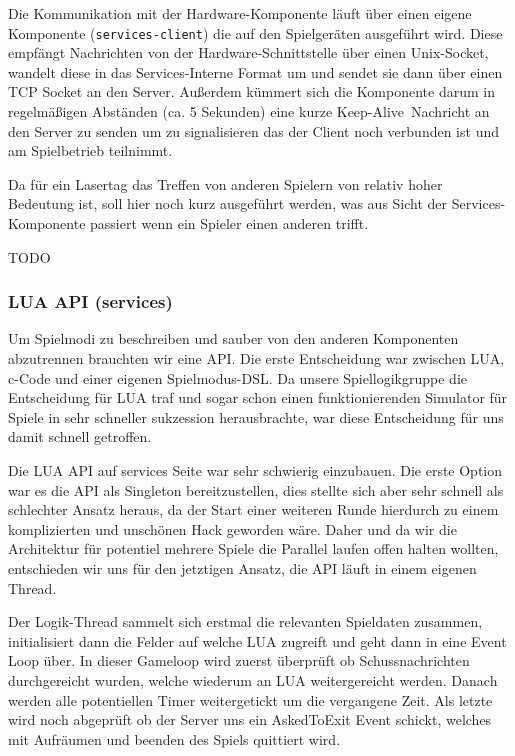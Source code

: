 Die Kommunikation mit der Hardware-Komponente läuft über einen eigene Komponente (\texttt{services-client}) die auf den Spielgeräten ausgeführt wird. Diese empfängt Nachrichten von der Hardware-Schnittstelle über einen Unix-Socket, wandelt diese in das Services-Interne Format um und sendet sie dann über einen TCP Socket an den Server. Außerdem kümmert sich die Komponente darum in regelmäßigen Abständen (ca. 5 Sekunden) eine kurze \glqq Keep-Alive\grqq \, Nachricht an den Server zu senden um zu signalisieren das der Client noch verbunden ist und am Spielbetrieb teilnimmt.

Da für ein Lasertag das Treffen von anderen Spielern von relativ hoher Bedeutung ist, soll hier noch kurz ausgeführt werden, was aus Sicht der Services-Komponente passiert wenn ein Spieler einen anderen trifft.

TODO

\subsubsection{LUA API (services)}

Um Spielmodi zu beschreiben und sauber von den anderen Komponenten abzutrennen brauchten wir eine API. Die erste Entscheidung war zwischen LUA, c-Code und einer eigenen Spielmodus-DSL. Da unsere Spiellogikgruppe die Entscheidung für LUA traf und sogar schon einen funktionierenden Simulator für Spiele in sehr schneller sukzession herausbrachte, war diese Entscheidung für uns damit schnell getroffen.

Die LUA API auf services Seite war sehr schwierig einzubauen. Die erste Option war es die API als Singleton bereitzustellen, dies stellte sich aber sehr schnell als schlechter Ansatz heraus, da der Start einer weiteren Runde hierdurch zu einem komplizierten und unschönen Hack geworden wäre. Daher und da wir die Architektur für potentiel mehrere Spiele die Parallel laufen offen halten wollten, entschieden wir uns für den jetztigen Ansatz, die API läuft in einem eigenen Thread. 

Der Logik-Thread sammelt sich erstmal die relevanten Spieldaten zusammen, initialisiert dann die Felder auf welche LUA zugreift und geht dann in eine Event Loop über. In dieser Gameloop wird zuerst überprüft ob Schussnachrichten durchgereicht wurden, welche wiederum an LUA weitergereicht werden. Danach werden alle potentiellen Timer weitergetickt um die vergangene Zeit. Als letzte wird noch abgeprüft ob der Server uns ein AskedToExit Event schickt, welches mit Aufräumen und beenden des Spiels quittiert wird.

